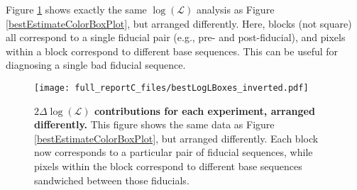 \documentclass{article}[11pt]
\begin{document}
{Figure \ref{invertedBestEstimateColorBoxPlot} shows exactly the same $\log(\mathcal{L})$ analysis as Figure \ref{bestEstimateColorBoxPlot}, but arranged differently.  Here, blocks (not square) all correspond to a single fiducial pair (e.g., pre- and post-fiducial), and pixels within a block correspond to different base sequences.  This can be useful for diagnosing a single bad fiducial sequence.

\begin{figure}
\begin{center}
\texttt{[image: full\_reportC\_files/bestLogLBoxes\_inverted.pdf]}
\caption{\textbf{$2\Delta\log(\mathcal{L})$ contributions for each experiment, arranged differently.}  This figure shows the same data as Figure \ref{bestEstimateColorBoxPlot}, but arranged differently.  Each block now corresponds to a particular pair of fiducial sequences, while pixels within the block correspond to different base sequences sandwiched between those fiducials.\label{invertedBestEstimateColorBoxPlot}}
\end{center}
\end{figure}

}{}
\end{document}
